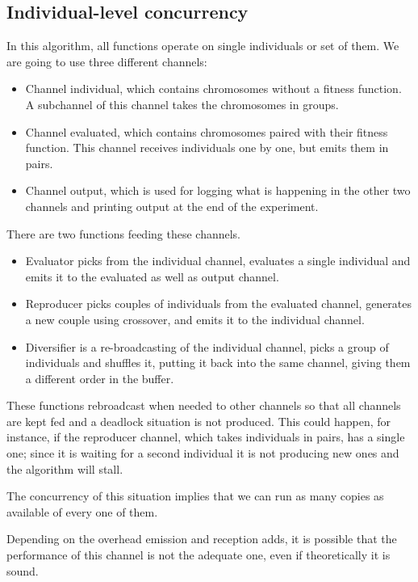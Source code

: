 \documentclass[sigconf]{acmart}
\begin{document}
\subsection{Individual-level concurrency}
\label{ss:indi}

In this algorithm, all functions operate on single individuals or set
of them. We are going to use three different channels:\begin{itemize}
\item Channel {\sf individual}, which contains chromosomes without a fitness
  function. A subchannel of this channel takes the chromosomes in groups.
\item Channel {\sf evaluated}, which contains chromosomes paired with
  their fitness function. This channel receives individuals one by
  one, but emits them in pairs.
\item Channel {\sf output}, which is used for logging what is
  happening in the other two channels and printing output at the end
  of the experiment.
\end{itemize}

There are two functions feeding these channels. \begin{itemize}
  
\item {\sf Evaluator} picks from the {\sf individual} channel,
  evaluates a single individual and emits it to the {\sf evaluated} as
  well as {\sf output} channel. 
\item {\sf Reproducer} picks couples of individuals from the {\sf
    evaluated} channel, generates a new couple using crossover, and
  emits it to the {\sf individual} channel. 
\item {\sf Diversifier} is a re-broadcasting of the {\sf individual
    channel}, picks a group of individuals and shuffles it, putting it
  back into the same channel, giving them a different order in the
  buffer.
\end{itemize}

These functions rebroadcast when needed to other channels so that all
channels are kept fed and a deadlock situation is not produced. This
could happen, for instance, if the {\sf reproducer channel}, which
takes individuals in pairs, has a single one; since it is waiting for
a second individual it is not producing new ones and the algorithm
will stall. 

The concurrency of this situation implies that we can run as many
copies as available of every one of them.

Depending on the overhead emission and reception adds, it is possible
that the performance of this channel is not the adequate one, even if
theoretically it is sound. 
\end{document}
